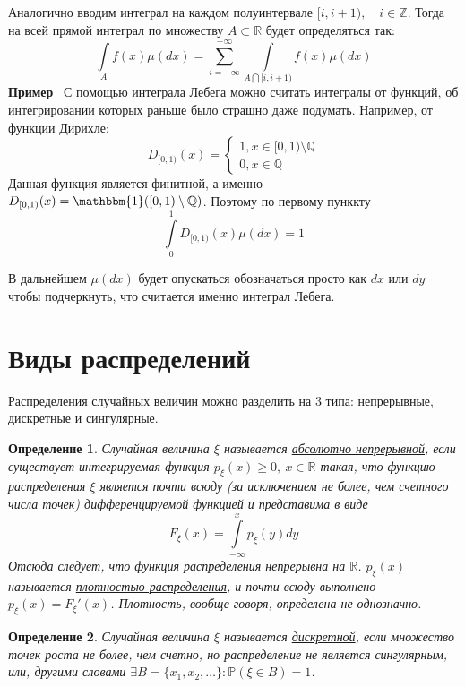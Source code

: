 \documentclass[12pt]{article}
\newtheorem{Def}{Определение}
\newenvironment{Ex}{{\bf Пример}\ }{}
\numberwithin{Th}{section}
\numberwithin{Def}{section}
\numberwithin{Lem}{section}
\numberwithin{St}{section}
\numberwithin{equation}{section}
\newcommand\Pro{\mathbb{P}} %
\newcommand\Real{\mathbb{R}} %
\newcommand\Ind{\mathbbm{1}} %
\begin{document}
	Аналогично вводим интеграл на каждом полуинтервале $[i, i+1), \quad i \in \mathbb{Z}$. Тогда на всей прямой интеграл по множеству $A \subset \Real$ будет определяться так:
	$$ \int\limits_A f(x) \mu(dx) = \sum\limits_{i=-\infty}^{+\infty} \int\limits_{A \bigcap [i, i+1)} f(x) \mu(dx) $$
\begin{Ex}
С помощью интеграла Лебега можно считать интегралы от функций, об интегрировании которых раньше было страшно даже подумать. Например, от функции Дирихле:
  \[
  	D_{[0,1)}(x) = 
  	\begin{cases}
  		1, x \in [0,1) \setminus \mathbb{Q} \\
  		0, x \in \mathbb{Q}
  	\end{cases}
  \]
  Данная функция является финитной, а именно $D_{[0,1)}(x) = \Ind([0,1) \setminus \mathbb{Q})$. Поэтому по первому пунккту
  $$ \int\limits_0^1 D_{[0,1)}(x) \mu(dx) = 1 $$
\end{Ex}

  В дальнейшем $\mu(dx)$ будет опускаться обозначаться просто как $dx$ или $dy$ чтобы подчеркнуть, что считается именно интеграл Лебега.
  
 \newpage
\section{Виды распределений}

Распределения случайных величин можно разделить на 3 типа: непрерывные, дискретные и сингулярные.

\begin{Def}
	Случайная величина $\xi$ называется \underline{абсолютно непрерывной}, если существует интегрируемая функция $p_\xi(x) \ge 0, \ x \in \Real$ такая, что
	функцию распределения $\xi$ является почти всюду (за исключением не более, чем счетного числа точек) дифференцируемой функцией и представима в виде
	$$F_\xi(x) = \int\limits_{-\infty}^x p_\xi(y)dy$$
	Отсюда следует, что функция распределения непрерывна на $\Real$. $p_\xi(x)$ называется \underline{плотностью распределения},
	и почти всюду выполнено $p_\xi(x)=F_\xi'(x)$.
	Плотность, вообще говоря, определена не однозначно.
\end{Def}

\begin{Def}
	Случайная величина $\xi$ называется \underline{дискретной}, если множество точек роста не более, чем счетно, но распределение не является сингулярным, или, 
	другими словами $\exists B = \{x_1, x_2, \ldots\} \colon \Pro(\xi \in B) = 1$.
\end{Def}
\end{document}
